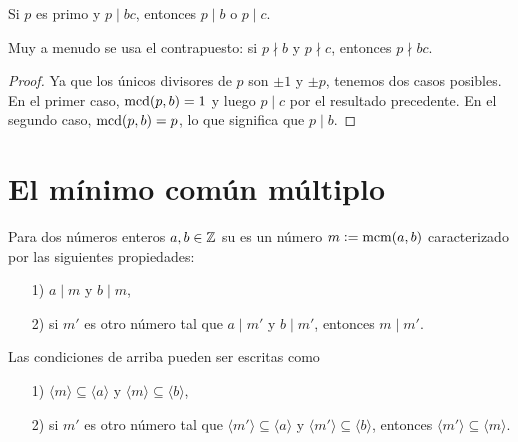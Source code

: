 \documentclass{article}
\numberwithin{equation}{section}
\begin{document}
\begin{corolario}
  \label{corr:primo-divide-producto}
  Si $p$ es primo y $p\mid bc$, entonces $p\mid b$ o $p\mid c$.
\end{corolario}

Muy a menudo se usa el contrapuesto: si $p\nmid b$ y $p\nmid c$, entonces
$p\nmid bc$.

\begin{proof}
  Ya que los únicos divisores de $p$ son $\pm 1$ y $\pm p$, tenemos dos casos
  posibles. En el primer caso, $\operatorname{mcd} (p,b) = 1$ y luego $p\mid c$ por el
  resultado precedente. En el segundo caso, $\operatorname{mcd} (p,b) = p$, lo que significa
  que $p\mid b$.
\end{proof}


\section{El mínimo común múltiplo}

\begin{definicion}
  \label{dfn:minimo-comun-multiplo}
  Para dos números enteros $a,b\in \mathbb{Z}$ su  es un número
  $m \mathrel{\mathop:}= \operatorname{mcm} (a,b)$ caracterizado por las siguientes propiedades:

  \begin{enumerate}
  \item[1)] $a\mid m$ y $b\mid m$,

  \item[2)] si $m'$ es otro número tal que $a\mid m'$ y $b\mid m'$, entonces
    $m \mid m'$.
  \end{enumerate}
\end{definicion}

Las condiciones de arriba pueden ser escritas como

\begin{enumerate}
\item[1)] $\langle m\rangle \subseteq \langle a\rangle$ y
  $\langle m\rangle \subseteq \langle b\rangle$,

\item[2)] si $m'$ es otro número tal que
  $\langle m'\rangle \subseteq \langle a\rangle$ y
  $\langle m'\rangle \subseteq \langle b\rangle$, entonces
  $\langle m'\rangle \subseteq \langle m\rangle$.
\end{enumerate}
\end{document}
